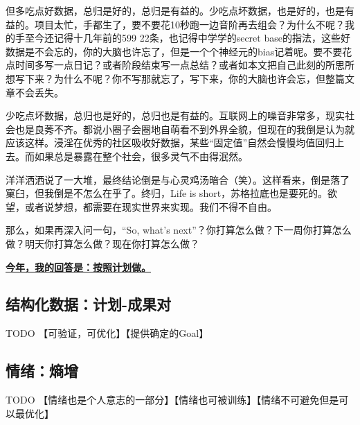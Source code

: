 \documentclass[11pt,twoside,fontset=none,scheme=plain]{ctexart}
\begin{document}
    但多吃点好数据，总归是好的，总归是有益的。少吃点坏数据，也是好的，也是有益的。项目太忙，手都生了，要不要花10秒跑一边音阶再去组会？为什么不呢？我的手至今还记得十几年前的599 22条，也记得中学学的secret base的指法，这些好数据是不会忘的，你的大脑也许忘了，但是一个个神经元的bias记着呢。要不要花点时间多写一点日记？或者阶段结束写一点总结？或者如本文把自己此刻的所思所想写下来？为什么不呢？你不写那就忘了，写下来，你的大脑也许会忘，但整篇文章不会丢失。

    少吃点坏数据，总归也是好的，总归也是有益的。互联网上的噪音非常多，现实社会也是良莠不齐。都说小圈子会圈地自萌看不到外界全貌，但现在的我倒是认为就应该这样。浸淫在优秀的社区吸收好数据，某些“固定值”自然会慢慢均值回归上去。而如果总是暴露在整个社会，很多灵气不由得泯然。

    洋洋洒洒说了一大堆，最终结论倒是与心灵鸡汤暗合（笑）。这样看来，倒是落了窠臼，但我倒是不怎么在乎了。终归，Life is short，苏格拉底也是要死的。欲望，或者说梦想，都需要在现实世界来实现。我们不得不自由。

    那么，如果再深入问一句，“So, what's next”？你打算怎么做？下一周你打算怎么做？明天你打算怎么做？现在你打算怎么做？

    \underline{\textbf{今年，我的回答是：按照计划做。}}

    \subsection{结构化数据：计划-成果对}
    TODO
    【可验证，可优化】【提供确定的Goal】
    
    \subsection{情绪：熵增}
    TODO
    【情绪也是个人意志的一部分】【情绪也可被训练】【情绪不可避免但是可以最优化】

    
    
\end{document}
